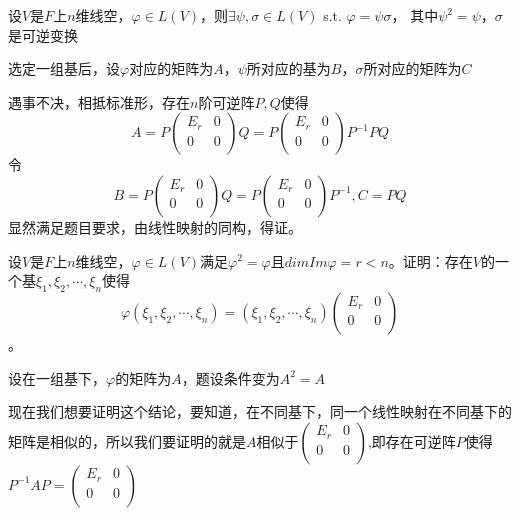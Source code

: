 \documentclass[lang=cn,10pt]{elegantbook}
\begin{document}
\begin{example}
	设$V$是$F$上$n$维线空$，\varphi\in L(V)$，则$\exists\psi,\sigma\in L(V)$ s.t. $\varphi=\psi\sigma$，
	其中$\psi^2=\psi$，$\sigma$是可逆变换
\end{example}
\begin{solution}
	
	选定一组基后，设$\varphi$对应的矩阵为$A$，$\psi$所对应的基为$B$，$\sigma$所对应的矩阵为$C$
	
	遇事不决，相抵标准形，存在$n$阶可逆阵$P,Q$使得
	\begin{equation*}
		A=P\left( \begin{matrix}
			E_r&		0\\
			0&		0\\
		\end{matrix} \right)Q=P\left( \begin{matrix}
		E_r&		0\\
		0&		0\\
		\end{matrix} \right)P^{-1}PQ
	\end{equation*}
	令
	\begin{equation*}
		B=P\left( \begin{matrix}
			E_r&		0\\
			0&		0\\
		\end{matrix} \right)Q=P\left( \begin{matrix}
			E_r&		0\\
			0&		0\\
		\end{matrix} \right)P^{-1},C=PQ
	\end{equation*}
	显然满足题目要求，由线性映射的同构，得证。
\end{solution}
\begin{example}
	设$V$是$F$上$n$维线空，$\varphi\in L(V)$满足$\varphi^2=\varphi$且$dimIm{\varphi}=r<n$。证明：存在$V$的一个基$\xi_1,\xi_2,\cdots,\xi_n$使得
	\begin{equation*}
		\varphi(\xi_1,\xi_2,\cdots,\xi_n)=(\xi_1,\xi_2,\cdots,\xi_n)\left(\begin{matrix}E_r&0\\0&0\\\end{matrix}\right)
	\end{equation*}
	。
\end{example}

\begin{solution}
	
	设在一组基下，$\varphi$的矩阵为$A$，题设条件变为$A^{2}=A$
	
	现在我们想要证明这个结论，要知道，在不同基下，同一个线性映射在不同基下的矩阵是相似的，所以我们要证明的就是$A$相似于$\left(\begin{matrix}E_r&0\\0&0\\\end{matrix}\right)$,即存在可逆阵$P$使得$P^{-1}AP=\left(\begin{matrix}E_r&0\\0&0\\\end{matrix}\right)$
\end{solution}
\end{document}
